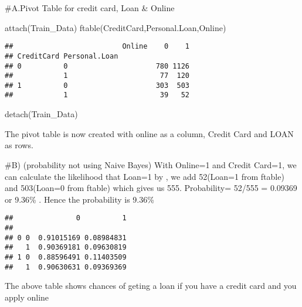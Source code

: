 \documentclass[
]{article}
\newenvironment{Shaded}{\begin{snugshade}}{\end{snugshade}}
\newcommand{\AttributeTok}[1]{\textcolor[rgb]{0.77,0.63,0.00}{#1}}
\newcommand{\DecValTok}[1]{\textcolor[rgb]{0.00,0.00,0.81}{#1}}
\newcommand{\FunctionTok}[1]{\textcolor[rgb]{0.00,0.00,0.00}{#1}}
\newcommand{\NormalTok}[1]{#1}
\newcommand{\SpecialCharTok}[1]{\textcolor[rgb]{0.00,0.00,0.00}{#1}}
\begin{document}
\#A.Pivot Table for credit card, Loan \& Online

\begin{Shaded}
\begin{Highlighting}[]
\FunctionTok{attach}\NormalTok{(Train\_Data)}
\FunctionTok{ftable}\NormalTok{(CreditCard,Personal.Loan,Online)}
\end{Highlighting}
\end{Shaded}

\begin{verbatim}
##                          Online    0    1
## CreditCard Personal.Loan                 
## 0          0                     780 1126
##            1                      77  120
## 1          0                     303  503
##            1                      39   52
\end{verbatim}

\begin{Shaded}
\begin{Highlighting}[]
\FunctionTok{detach}\NormalTok{(Train\_Data)}
\end{Highlighting}
\end{Shaded}

The pivot table is now created with online as a column, Credit Card and
LOAN as rows.

\#B) (probability not using Naive Bayes) With Online=1 and Credit
Card=1, we can calculate the likelihood that Loan=1 by , we add
52(Loan=1 from ftable) and 503(Loan=0 from ftable) which gives us 555.
Probability= 52/555 = 0.09369 or 9.36\% . Hence the probability is
9.36\%

\begin{Shaded}
\end{Shaded}

\begin{verbatim}
##               0          1
##                           
## 0 0  0.91015169 0.08984831
##   1  0.90369181 0.09630819
## 1 0  0.88596491 0.11403509
##   1  0.90630631 0.09369369
\end{verbatim}

The above table shows chances of geting a loan if you have a credit card
and you apply online
\end{document}
